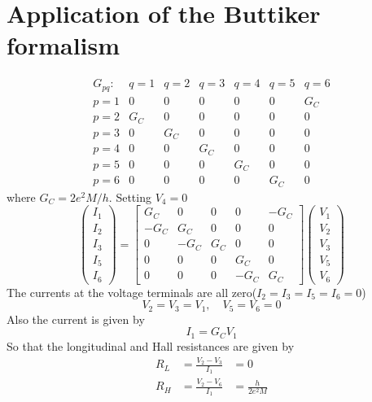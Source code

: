 \documentclass[11pt,a4paper]{book}
\theoremstyle{plain}
\theoremstyle{definition}
\theoremstyle{remark}
\begin{document}
\section{Application of the Buttiker formalism}
\begin{equation}
    \begin{matrix}
        G_{pq}: & q = 1 & q = 2 & q = 3 & q = 4 & q = 5 & q = 6 \\
        p = 1 & 0 & 0 & 0 & 0 & 0 & G_C \\
        p = 2 & G_C & 0 & 0 & 0 & 0 & 0 \\
        p = 3 & 0 & G_C & 0 & 0 & 0 & 0 \\
        p = 4 & 0 & 0 & G_C & 0 & 0 & 0 \\
        p = 5 & 0 & 0 & 0 & G_C & 0 & 0 \\
        p = 6 & 0 & 0 & 0 & 0 & G_C & 0
    \end{matrix}
\end{equation}
where $G_C = 2 e^2 M/h$. Setting $V_4 = 0$
\begin{equation}
    \begin{pmatrix}
        I_1 \\ I_2 \\ I_3 \\ I_5 \\ I_6
    \end{pmatrix}
    =
    \begin{bmatrix}
        G_C & 0 & 0 & 0 & -G_C \\
        -G_C & G_C & 0 & 0 & 0 \\
        0 & -G_C & G_C & 0 & 0 \\
        0 & 0 & 0 & G_C & 0 \\
        0 & 0 & 0 & -G_C & G_C
    \end{bmatrix}
    \begin{pmatrix}
        V_1 \\ V_2 \\ V_3 \\ V_5 \\ V_6
    \end{pmatrix}
\end{equation}
The currents at the voltage terminals are all zero($I_2=I_3=I_5=I_6=0$)
\begin{equation}
    V_2 = V_3 = V_1, \quad V_5 = V_6 = 0
\end{equation}
Also the current is given by 
\begin{equation}
    I_1 = G_C V_1
\end{equation}
So that the longitudinal and Hall resistances are given by
\begin{equation}
    \begin{aligned}
        R_L &= \frac{V_2 - V_3}{I_1} & = 0 \\
        R_H &= \frac{V_2 - V_6}{I_1} & = \frac{h}{2 e^2 M}
    \end{aligned}
\end{equation}
\end{document}
